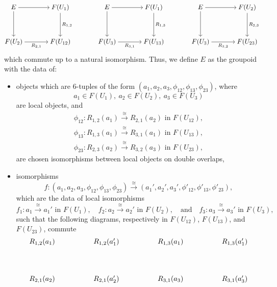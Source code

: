 \begin{answer}
\[\begin{tikzcd}[cramped,column sep=scriptsize]
    	E && {F(U_1)} && E && {F(U_1)} && E && {F(U_2)} \\
    	\\
    	{F(U_2)} && {F(U_{12})} && {F(U_3)} && {F(U_{13})} && {F(U_3)} && {F(U_{23})}
    	\arrow[from=1-1, to=1-3]
    	\arrow[from=1-1, to=3-1]
    	\arrow["{{{R_{1,2}}}}", from=1-3, to=3-3]
    	\arrow[from=1-5, to=1-7]
    	\arrow[from=1-5, to=3-5]
    	\arrow["{{{R_{1,3}}}}", from=1-7, to=3-7]
    	\arrow[from=1-9, to=1-11]
    	\arrow[from=1-9, to=3-9]
    	\arrow["{{{R_{2,3}}}}", from=1-11, to=3-11]
    	\arrow["{{{R_{2,1}}}}"', from=3-1, to=3-3]
    	\arrow["{{{R_{3,1}}}}"', from=3-5, to=3-7]
    	\arrow["{{{R_{3,2}}}}"', from=3-9, to=3-11]
    \end{tikzcd}\]
    which commute up to a natural isomorphism. Thus, we define \( E \) as the groupoid with the data of:
    \begin{itemize}
        \item objects which are $6$-tuples of the form $(a_1,a_2,a_3,\phi_{12},\phi_{13},\phi_{23})$, where
        $$
        a_1 \in F(U_1), \ a_2 \in F(U_2), \ a_3 \in F(U_3)
        $$
        are local objects, and
        \begin{align*}
            \phi_{12}: R_{1,2}(a_1) \xrightarrow{\cong} R_{2,1}(a_2) \text{ in } F(U_{12}), \\
            \phi_{13}: R_{1,3}(a_1) \xrightarrow{\cong} R_{3,1}(a_1) \text{ in } F(U_{13}), \\
            \phi_{23}: R_{2,3}(a_2) \xrightarrow{\cong} R_{3,2}(a_3) \text{ in } F(U_{23}),
        \end{align*}
        are chosen isomorphisms between local objects on double overlaps,
        \item isomorphisms 
        $$
        f: (a_1,a_2,a_3,\phi_{12},\phi_{13},\phi_{23})  \xrightarrow{\cong} (a_1',a_2',a_3',\phi'_{12},\phi'_{13},\phi'_{23}),
        $$
        which are the data of local isomorphisms 
        $$
        f_1: a_1 \xrightarrow{\cong} a_1' \text{ in } F(U_1), \quad f_2: a_2 \xrightarrow{\cong} a_2' \text{ in } F(U_2), \quad \text{and} \quad f_3: a_3 \xrightarrow{\cong} a_3' \text{ in } F(U_3),
        $$
        such that the following diagrams, respectively in $F(U_{12})$, $F(U_{13})$, and $F(U_{23})$, commute
        \[\begin{tikzcd}[cramped]
        	{R_{1,2}(a_1)} && {R_{1,2}(a_1')} && {R_{1,3}(a_1)} && {R_{1,3}(a_1')} \\
        	\\
        	{R_{2,1}(a_2)} && {R_{2,1}(a_2')} && {R_{3,1}(a_3)} && {R_{3,1}(a_3')} \\

\end{tikzcd}\]
\end{itemize}
\end{answer}
